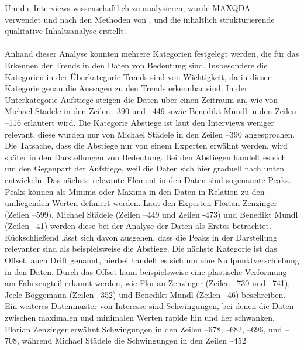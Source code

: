 Um die Interviews wissenschaftlich zu analysieren, wurde MAXQDA\\ \cite{MAXQDA.2023} verwendet und nach den Methoden von \cite{Mayring.2022}, \cite{Kuckartz.2022} und \cite{AndreMorgensternEinenkel.2023} die inhaltlich strukturierende qualitative Inhaltsanalyse erstellt. \\\\Anhand dieser Analyse konnten mehrere Kategorien festgelegt werden, die für das Erkennen der Trends in den Daten von Bedeutung sind. Insbesondere die Kategorien in der Überkategorie Trends sind von Wichtigkeit, da in dieser Kategorie genau die Aussagen zu den Trends erkennbar sind. In der Unterkategorie Aufstiege steigen die Daten über einen Zeitraum an, wie von Michael Städele in den Zeilen --390 und --449 sowie Benedikt Mundl in den Zeilen --116 erläutert wird. Die Kategorie Abstiege ist laut den Interviews weniger relevant, diese wurden nur von Michael Städele in den Zeilen --390 angesprochen. Die Tatsache, dass die Abstiege nur von einem Experten erwähnt werden, wird später in den Darstellungen von Bedeutung. Bei den Abstiegen handelt es sich um den Gegenpart der Aufstiege, weil die Daten sich hier graduell nach unten entwickeln. Das nächste relevante Element in den Daten sind sogenannte Peaks. Peaks können als Minima oder Maxima in den Daten in Relation zu den umliegenden Werten definiert werden. Laut den Experten Florian Zenzinger (Zeilen --599), Michael Städele (Zeilen --449 und Zeilen -473) und Benedikt Mundl (Zeilen --41) werden diese bei der Analyse der Daten als Erstes betrachtet. Rückschließend lässt sich davon ausgehen, dass die Peaks in der Darstellung relevanter sind als beispielsweise die Abstiege. Die nächste Kategorie ist das Offset, auch Drift genannt, hierbei handelt es sich um eine Nullpunktverschiebung in den Daten. Durch das Offset kann beispielsweise eine plastische Verformung am Fahrzeugteil erkannt werden, wie Florian Zenzinger (Zeilen --730 und --741), Jeele Böggemann (Zeilen --352) und Benedikt Mundl (Zeilen  --46)  beschreiben. Ein weiteres Datenmuster von Interesse sind Schwingungen, bei denen die Daten zwischen maximalen und minimalen Werten rapide hin und her schwanken. Florian Zenzinger erwähnt Schwingungen in den Zeilen --678, --682, --696,  und --708, während Michael Städele die Schwingungen in den Zeilen --452 